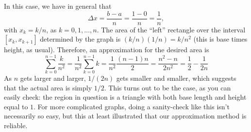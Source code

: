 \documentclass[nooutcomes]{ximera}
\begin{document}
\begin{example}
\begin{explanation}
    In this case, we have in general that $$\Delta x = \frac{b-a}{n} = \frac{1-0}{n} = \frac{1}{n},$$with $x_k = k/n$, as $k=0,1,\ldots, n$. The area of the ``left'' rectangle over the interval $[x_k,x_{k+1}]$ determined by the graph is $(k/n)(1/n) = k/n^2$ (this is base times height, as usual). Therefore, an approximation for the desired area is $$\sum_{k=0}^{n-1}\frac{k}{n^2} = \frac{1}{n^2}\sum_{k=0}^{n-1} k = \frac{1}{n^2} \frac{(n-1)n}{2} = \frac{n^2-n}{2n^2} = \frac{1}{2} - \frac{1}{2n}$$
As $n$ gets larger and larger, $1/(2n)$ gets smaller and smaller, which suggests that the actual area is simply $1/2$. This turns out to be the case, as you can easily check: the region in question is a triangle with both base length and height equal to $1$. For more complicated graphs, doing a sanity-check like this isn't necessarily so easy, but this at least illustrated that our approximation method is reliable.    
  \end{explanation}
\end{example}
\end{document}
